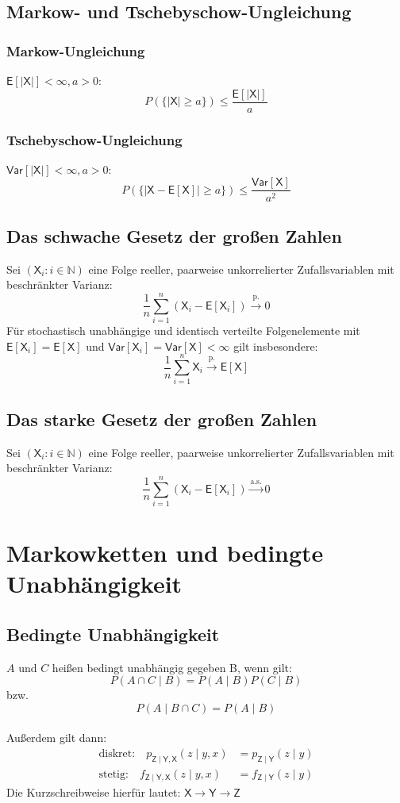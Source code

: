 \documentclass[a4paper,twocolumn,10pt]{article}
\newcommand{\var}{\mathsf{Var}}
\newcommand{\erw}{\mathsf{E}}
\begin{document}
\subsection{Markow- und Tschebyschow-Ungleichung}

\subsubsection{Markow-Ungleichung}
$\erw[|\mathsf{X}|] < \infty,a > 0$:
\[ P(\{|\mathsf{X}| \geq a\}) \leq \frac{\erw[|\mathsf{X}|]}{a}\]

\subsubsection{Tschebyschow-Ungleichung}
$\var[|\mathsf{X}|] < \infty,a > 0$:
\[ P(\{|\mathsf{X} - \erw[\mathsf{X}]| \geq a\}) \leq \frac{\var[\mathsf{X}]}{a^{2}}\]

\subsection{Das schwache Gesetz der großen Zahlen}
Sei $(\mathsf{X}_{i}: i \in \mathbb{N})$ eine Folge reeller, paarweise unkorrelierter Zufallsvariablen mit beschränkter Varianz: 
\[ \frac{1}{n} \sum \limits_{i=1}^{n} (\mathsf{X}_{i} - \erw[\mathsf{X}_{i}]) \stackrel{\text{p.}}{\to} 0  \]
Für stochastisch unabhängige und identisch verteilte Folgenelemente mit $\erw[\mathsf{X}_{i}] = \erw[\mathsf{X}]$ und $\var[\mathsf{X}_{i}] = \var[\mathsf{X}] < \infty$ gilt insbesondere:
\[ \frac{1}{n} \sum \limits_{i=1}^{n} \mathsf{X}_{i} \stackrel{\text{p.}}{\to} \erw[\mathsf{X}]\]

\subsection{Das starke Gesetz der großen Zahlen}
Sei $(\mathsf{X}_{i}: i \in \mathbb{N})$ eine Folge reeller, paarweise unkorrelierter Zufallsvariablen mit beschränkter Varianz:
\[ \frac{1}{n} \sum \limits_{i=1}^{n} (\mathsf{X}_{i} - \erw[\mathsf{X}_{i}]) \stackrel{\text{a.s.}}{\to} 0  \]

\section{Markowketten und bedingte Unabhängigkeit}
\subsection{Bedingte Unabhängigkeit}
$A$ und $C$ heißen bedingt unabhängig gegeben B, wenn gilt:
\[ P(A \cap C \mid B) = P(A \mid B)P(C\mid B)\]
bzw.
\[ P(A \mid B \cap C) = P(A \mid B)\] \\
Außerdem gilt dann:
\begin{align} \text{diskret:} \quad p_{\mathsf{Z \mid Y,X}}(z \mid y,x) &= p_{\mathsf{Z \mid Y}}(z \mid y)\nonumber\\
\text{stetig:} \quad f_{\mathsf{Z \mid Y,X}}(z \mid y,x) & = f_{\mathsf{Z \mid Y}}(z \mid y)\nonumber 
\end{align}
Die Kurzschreibweise hierfür lautet: $\mathsf{X \rightarrow Y \rightarrow Z}$
\end{document}
